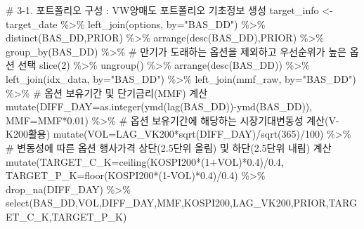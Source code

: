 \documentclass[
  a4paper,
  DIV=11,
  numbers=noendperiod]{scrreprt}
\newenvironment{Shaded}{\begin{snugshade}}{\end{snugshade}}
\newcommand{\AttributeTok}[1]{\textcolor[rgb]{0.40,0.45,0.13}{#1}}
\newcommand{\CommentTok}[1]{\textcolor[rgb]{0.37,0.37,0.37}{#1}}
\newcommand{\DecValTok}[1]{\textcolor[rgb]{0.68,0.00,0.00}{#1}}
\newcommand{\FloatTok}[1]{\textcolor[rgb]{0.68,0.00,0.00}{#1}}
\newcommand{\FunctionTok}[1]{\textcolor[rgb]{0.28,0.35,0.67}{#1}}
\newcommand{\NormalTok}[1]{\textcolor[rgb]{0.00,0.23,0.31}{#1}}
\newcommand{\OtherTok}[1]{\textcolor[rgb]{0.00,0.23,0.31}{#1}}
\newcommand{\SpecialCharTok}[1]{\textcolor[rgb]{0.37,0.37,0.37}{#1}}
\newcommand{\StringTok}[1]{\textcolor[rgb]{0.13,0.47,0.30}{#1}}
\begin{document}
\begin{Shaded}
\begin{Highlighting}[]
\CommentTok{\# 3{-}1. 포트폴리오 구성 : VW양매도 포트폴리오 기초정보 생성}
\NormalTok{target\_info }\OtherTok{\textless{}{-}}\NormalTok{ target\_date }\SpecialCharTok{\%\textgreater{}\%} 
  \FunctionTok{left\_join}\NormalTok{(options, }\AttributeTok{by=}\StringTok{"BAS\_DD"}\NormalTok{) }\SpecialCharTok{\%\textgreater{}\%} 
  \FunctionTok{distinct}\NormalTok{(BAS\_DD,PRIOR) }\SpecialCharTok{\%\textgreater{}\%} 
  \FunctionTok{arrange}\NormalTok{(}\FunctionTok{desc}\NormalTok{(BAS\_DD),PRIOR) }\SpecialCharTok{\%\textgreater{}\%} 
  \FunctionTok{group\_by}\NormalTok{(BAS\_DD) }\SpecialCharTok{\%\textgreater{}\%} 
  \CommentTok{\# 만기가 도래하는 옵션을 제외하고 우선순위가 높은 옵션 선택}
  \FunctionTok{slice}\NormalTok{(}\DecValTok{2}\NormalTok{) }\SpecialCharTok{\%\textgreater{}\%} 
  \FunctionTok{ungroup}\NormalTok{() }\SpecialCharTok{\%\textgreater{}\%} 
  \FunctionTok{arrange}\NormalTok{(}\FunctionTok{desc}\NormalTok{(BAS\_DD)) }\SpecialCharTok{\%\textgreater{}\%} 
  \FunctionTok{left\_join}\NormalTok{(idx\_data, }\AttributeTok{by=}\StringTok{"BAS\_DD"}\NormalTok{) }\SpecialCharTok{\%\textgreater{}\%} 
  \FunctionTok{left\_join}\NormalTok{(mmf\_raw, }\AttributeTok{by=}\StringTok{"BAS\_DD"}\NormalTok{) }\SpecialCharTok{\%\textgreater{}\%} 
  \CommentTok{\# 옵션 보유기간 및 단기금리(MMF) 계산}
  \FunctionTok{mutate}\NormalTok{(}\AttributeTok{DIFF\_DAY=}\FunctionTok{as.integer}\NormalTok{(}\FunctionTok{ymd}\NormalTok{(}\FunctionTok{lag}\NormalTok{(BAS\_DD))}\SpecialCharTok{{-}}\FunctionTok{ymd}\NormalTok{(BAS\_DD)),}
         \AttributeTok{MMF=}\NormalTok{MMF}\SpecialCharTok{*}\FloatTok{0.01}\NormalTok{) }\SpecialCharTok{\%\textgreater{}\%} 
  \CommentTok{\# 옵션 보유기간에 해당하는 시장기대변동성 계산(V{-}K200활용)}
  \FunctionTok{mutate}\NormalTok{(}\AttributeTok{VOL=}\NormalTok{LAG\_VK200}\SpecialCharTok{*}\FunctionTok{sqrt}\NormalTok{(DIFF\_DAY)}\SpecialCharTok{/}\FunctionTok{sqrt}\NormalTok{(}\DecValTok{365}\NormalTok{)}\SpecialCharTok{/}\DecValTok{100}\NormalTok{) }\SpecialCharTok{\%\textgreater{}\%}
  \CommentTok{\# 변동성에 따른 옵션 행사가격 상단(2.5단위 올림) 및 하단(2.5단위 내림) 계산}
  \FunctionTok{mutate}\NormalTok{(}\AttributeTok{TARGET\_C\_K=}\FunctionTok{ceiling}\NormalTok{(KOSPI200}\SpecialCharTok{*}\NormalTok{(}\DecValTok{1}\SpecialCharTok{+}\NormalTok{VOL)}\SpecialCharTok{*}\FloatTok{0.4}\NormalTok{)}\SpecialCharTok{/}\FloatTok{0.4}\NormalTok{,}
         \AttributeTok{TARGET\_P\_K=}\FunctionTok{floor}\NormalTok{(KOSPI200}\SpecialCharTok{*}\NormalTok{(}\DecValTok{1}\SpecialCharTok{{-}}\NormalTok{VOL)}\SpecialCharTok{*}\FloatTok{0.4}\NormalTok{)}\SpecialCharTok{/}\FloatTok{0.4}\NormalTok{) }\SpecialCharTok{\%\textgreater{}\%} 
  \FunctionTok{drop\_na}\NormalTok{(DIFF\_DAY) }\SpecialCharTok{\%\textgreater{}\%} 
  \FunctionTok{select}\NormalTok{(BAS\_DD,VOL,DIFF\_DAY,MMF,KOSPI200,LAG\_VK200,PRIOR,TARGET\_C\_K,TARGET\_P\_K)}


\end{Highlighting}
\end{Shaded}
\end{document}
